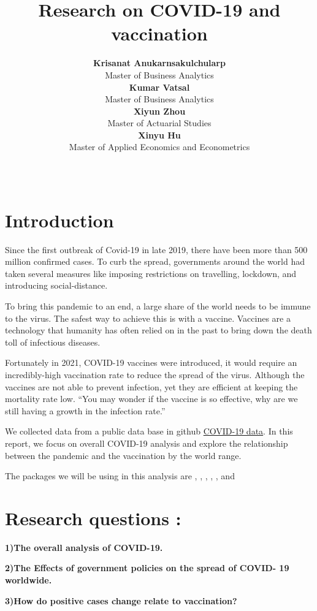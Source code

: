 \documentclass[11pt,a4paper,]{article}
\title{Research on COVID-19 and vaccination}
\author{\sf\Large\textbf{ Krisanat Anukarnsakulchularp}\\ {\sf\large Master of Business Analytics\\[0.5cm]} \sf\Large\textbf{ Kumar Vatsal}\\ {\sf\large Master of Business Analytics\\[0.5cm]} \sf\Large\textbf{ Xiyun Zhou}\\ {\sf\large Master of Actuarial Studies\\[0.5cm]} \sf\Large\textbf{ Xinyu Hu}\\ {\sf\large Master of Applied Economics and Econometrics\\[0.5cm]}}
\date{\sf\Date~\Month~\Year}
\makeatletter
\def\titlepage{\front{\expandafter{\@title}}{\@author}{\@organization}}
\makeatother
\begin{document}
\titlepage

\clearpage

\hypertarget{introduction}{%
\section{\texorpdfstring{\textbf{Introduction}}{Introduction}}\label{introduction}}

Since the first outbreak of Covid-19 in late 2019, there have been more than 500 million confirmed cases. To curb the spread, governments around the world had taken several measures like imposing restrictions on travelling, lockdown, and introducing social-distance.

To bring this pandemic to an end, a large share of the world needs to be immune to the virus. The safest way to achieve this is with a vaccine. Vaccines are a technology that humanity has often relied on in the past to bring down the death toll of infectious diseases.

Fortunately in 2021, COVID-19 vaccines were introduced, it would require an incredibly-high vaccination rate to reduce the spread of the virus. Although the vaccines are not able to prevent infection, yet they are efficient at keeping the mortality rate low. ``You may wonder if the vaccine is so effective, why are we still having a growth in the infection rate.''

We collected data from a public data base in github \href{https://github.com/owid/covid-19-data/tree/master/public/data}{COVID-19 data}. In this report, we focus on overall COVID-19 analysis and explore the relationship between the pandemic and the vaccination by the world range.

The packages we will be using in this analysis are \textcite{tidyverse}, \textcite{readr}, \textcite{kableExtra}, \textcite{bookdown}, \textcite{bookdown2}, and \textcite{ggplot2}

\clearpage

\hypertarget{research-questions}{%
\section{\texorpdfstring{\textbf{Research questions} :}{Research questions :}}\label{research-questions}}

\textbf{1)The overall analysis of COVID-19.}

\textbf{2)The Effects of government policies on the spread of COVID- 19 worldwide.}

\textbf{3)How do positive cases change relate to vaccination?}
\end{document}
